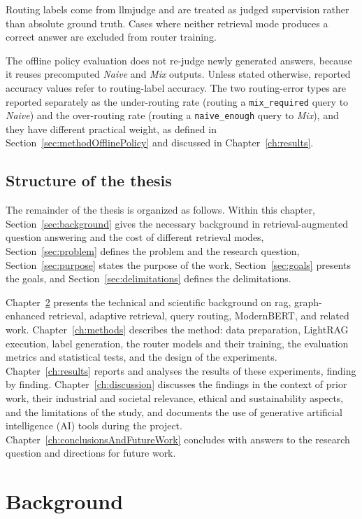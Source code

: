 \documentclass[english, bibtex]{kththesis}               %
\numberwithin{listing}{chapter}
\begin{document}
Routing labels come from \gls{llmjudge} and are treated as judged supervision rather than absolute ground truth. Cases where neither retrieval mode produces a correct answer are excluded from router training.

The offline policy evaluation does not re-judge newly generated answers, because it reuses precomputed \emph{Naive} and \emph{Mix} outputs. Unless stated otherwise, reported accuracy values refer to routing-label accuracy. The two routing-error types are reported separately as the under-routing rate (routing a \texttt{mix\_required} query to \emph{Naive}) and the over-routing rate (routing a \texttt{naive\_enough} query to \emph{Mix}), and they have different practical weight, as defined in Section~\ref{sec:methodOfflinePolicy} and discussed in Chapter~\ref{ch:results}.

\section{Structure of the thesis}
\label{sec:structure}

The remainder of the thesis is organized as follows. Within this chapter, Section~\ref{sec:background} gives the necessary background in retrieval-augmented question answering and the cost of different retrieval modes, Section~\ref{sec:problem} defines the problem and the research question, Section~\ref{sec:purpose} states the purpose of the work, Section~\ref{sec:goals} presents the goals, and Section~\ref{sec:delimitations} defines the delimitations.

Chapter~\ref{ch:background} presents the technical and scientific background on \gls{rag}, graph-enhanced retrieval, adaptive retrieval, query routing, ModernBERT, and related work. Chapter~\ref{ch:methods} describes the method: data preparation, LightRAG execution, label generation, the router models and their training, the evaluation metrics and statistical tests, and the design of the experiments. Chapter~\ref{ch:results} reports and analyses the results of these experiments, finding by finding. Chapter~\ref{ch:discussion} discusses the findings in the context of prior work, their industrial and societal relevance, ethical and sustainability aspects, and the limitations of the study, and documents the use of generative artificial intelligence (AI) tools during the project. Chapter~\ref{ch:conclusionsAndFutureWork} concludes with answers to the research question and directions for future work.

\cleardoublepage
\chapter{Background}
\label{ch:background}
\end{document}
